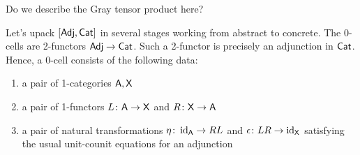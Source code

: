 \documentclass{amsart}
\begin{document}
{\daniel Do we describe the Gray tensor product here?}

Let's upack $ [\mathsf{Adj} , \mathsf{Cat}] $ in several stages working from
abstract to concrete. The 0-cells are 2-functors $ \mathsf{Adj} \to
\mathsf{Cat} $. Such a 2-functor is precisely an adjunction in $
\mathsf{Cat} $. Hence, a 0-cell consists of the following data:
\begin{enumerate}
\item a pair of 1-categories $ \mathsf{A}, \mathsf{X} $
\item a pair of 1-functors $ L \colon \mathsf{A} \to \mathsf{X} $ and $ R
  \colon \mathsf{X} \to \mathsf{A} $
\item a pair of natural transformations $ \eta \colon \operatorname{id}_{\mathsf{A}}
  \to RL $ and $ \epsilon \colon LR \to \operatorname{id}_{\mathsf{X}} $ satisfying
  the usual unit-counit equations for an adjunction
\end{enumerate}
\end{document}
